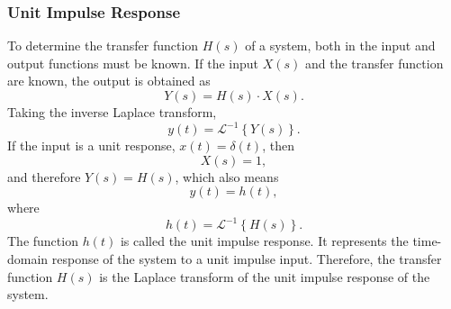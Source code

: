 \documentclass{article}
\begin{document}
\subsubsection{Unit Impulse Response}
To determine the transfer function $H(s)$ of a system, both in the input and output functions must be known. If the input $X(s)$ and the transfer function are known, the output is obtained as
\[
    Y(s)=H(s)\cdot X(s).
\]
Taking the inverse Laplace transform,
\[
    y(t)=\mathcal{L}^{-1}\left\{ Y(s) \right\}.
\]
If the input is a unit response, $x(t)=\delta (t)$, then
\[
    X(s)=1,
\]
and therefore $Y(s)=H(s)$, which also means
\[
    y(t)=h(t),
\]
where
\[
    h(t)=\mathcal{L}^{-1}\left\{ H(s) \right\}.
\]
The function $h(t)$ is called the unit impulse response. It represents the time-domain response of the system to a unit impulse input. Therefore, the transfer function $H(s)$ is the Laplace transform of the unit impulse response of the system.
\end{document}
